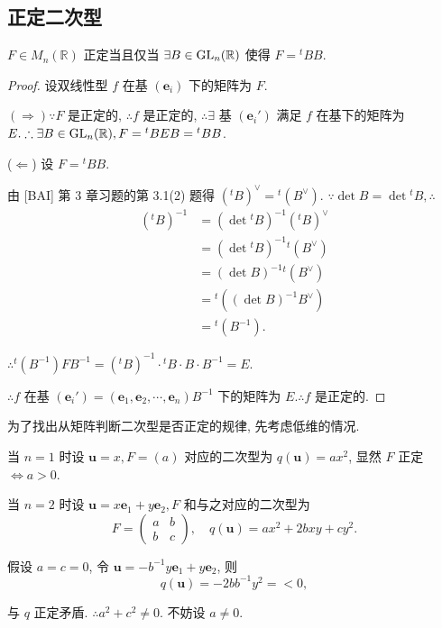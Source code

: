 \documentclass{ctexart}
\begin{document}
\subsection{正定二次型}
\begin{theorem}[书上的定理 6]
    $F\in M_n(\mathbb{R})$ 正定当且仅当 $\exists B\in\operatorname{GL} _n(\mathbb{R})$ 使得 $F={}^tBB$.
\end{theorem}
\begin{proof}
    设双线性型 $f$ 在基 $(\boldsymbol{e}_i)$ 下的矩阵为 $F$.
    
    $(\Rightarrow)\because F$ 是正定的, $\therefore f$ 是正定的, $\therefore\exists$ 基 $(\boldsymbol{e}_i')$ 满足 $f$ 在基下的矩阵为 $E.\therefore\exists B\in\operatorname{GL} _n(\mathbb{R}),F={}^tBEB={}^tBB$.

    ($\Leftarrow$) 设 $F={}^tBB$.

    由 [BAI] 第 3 章习题的第 3.1(2) 题得 $({}^tB)^\vee={}^t(B^\vee)$. $\because\det B=\det{}^tB,\therefore$
    \begin{align*}
        ({}^tB)^{-1} & =(\det{}^tB)^{-1}({}^tB)^\vee \\
        & =(\det{}^tB)^{-1}{}^t(B^\vee) \\
        & =(\det B)^{-1}{}^t(B^\vee) \\
        & ={}^t((\det B)^{-1}B^\vee) \\
        & ={}^t(B^{-1}).
    \end{align*}

    $\therefore{}^t(B^{-1})FB^{-1}=({}^tB)^{-1}\cdot{}^tB\cdot B\cdot B^{-1}=E$.

    $\therefore f$ 在基 $(\boldsymbol{e}_i')=(\boldsymbol{e}_1,\boldsymbol{e}_2,\cdots,\boldsymbol{e}_n)B^{-1}$ 下的矩阵为 $E.\therefore f$ 是正定的.
\end{proof}
为了找出从矩阵判断二次型是否正定的规律, 先考虑低维的情况.

当 $n=1$ 时设 $\boldsymbol{u}=x,F=(a)$ 对应的二次型为 $q(\boldsymbol{u})=ax^2$, 显然 $F$ 正定 $\Leftrightarrow a>0$.

当 $n=2$ 时设 $\boldsymbol{u}=x\boldsymbol{e}_1+y\boldsymbol{e}_2,F$ 和与之对应的二次型为
\[F=\begin{pmatrix}
    a & b \\
    b & c
\end{pmatrix},\quad q(\boldsymbol{u})=ax^2+2bxy+cy^2.\]

假设 $a=c=0$, 令 $\boldsymbol{u}=-b^{-1}y\boldsymbol{e}_1+y\boldsymbol{e}_2$, 则
\[q(\boldsymbol{u})=-2bb^{-1}y^2=<0,\]

与 $q$ 正定矛盾. $\therefore a^2+c^2\neq0$. 不妨设 $a\neq0$.
\end{document}
